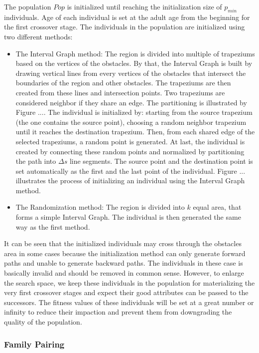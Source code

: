 \documentclass[final]{elsarticle}
\begin{document}
The population $Pop$ is initialized until reaching the initialization size of $p_{min}$ individuals. Age of each individual is set at the adult age from the beginning for the first crossover stage. The individuals in the population are initialized using two different methods:
\begin{itemize}
	\item The Interval Graph method: The region is divided into multiple of trapeziums based on the vertices of the obstacles. By that, the Interval Graph is built by drawing vertical lines from every vertices of the obstacles that intersect the boundaries of the region and other obstacles. The trapeziums are then created from these lines and intersection points. Two trapeziums are considered neighbor if they share an edge. The partitioning is illustrated by Figure .... The individual is initialized by: starting from the source trapezium (the one contains the source point), choosing a random neighbor trapezium until it reaches the destination trapezium. Then, from each shared edge of the selected trapeziums, a random point is generated. At last, the individual is created by connecting these random points and normalized by partitioning the path into $\Delta s$ line segments. The source point and the destination point is set automatically as the first and the last point of the individual. Figure ... illustrates the process of initializing an individual using the Interval Graph method.
	\item The Randomization method: The region is divided into $k$ equal area, that forms a simple Interval Graph. The individual is then generated the same way as the first method.
\end{itemize}
It can be seen that the initialized individuals may cross through the obstacles area in some cases because the initialization method can only generate forward paths and unable to generate backward paths. The individuals in these case is basically invalid and should be removed in common sense. However, to enlarge the search space, we keep these individuals in the population for materializing the very first crossover stages and expect their good attributes can be passed to the successors. The fitness values of these individuals will be set at a great number or infinity to reduce their impaction and prevent them from downgrading the quality of the population.

\subsubsection{Family Pairing}
\end{document}
